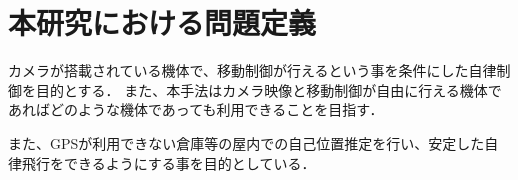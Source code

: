 \chapter{本研究における問題定義}
\label{issue}
カメラが搭載されている機体で、移動制御が行えるという事を条件にした自律制御を目的とする．
また、本手法はカメラ映像と移動制御が自由に行える機体であればどのような機体であっても利用できることを目指す．

また、GPSが利用できない倉庫等の屋内での自己位置推定を行い、安定した自律飛行をできるようにする事を目的としている．




